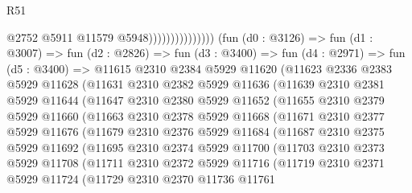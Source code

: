 \begin{lexlean}{R51}
\begin{coremodule}
                                      @2752
                                      @5911
                                      @11579
                                      @5948)))))))))))))))
        (fun (d0 : @3126) =>
        fun (d1 : @3007) =>
        fun (d2 : @2826) =>
        fun (d3 : @3400) =>
        fun (d4 : @2971) =>
        fun (d5 : @3400) =>
        @11615
          @2310
          @2384
          @5929
          @11620
          (@11623
            @2336
            @2383
            @5929
            @11628
            (@11631
              @2310
              @2382
              @5929
              @11636
              (@11639
                @2310
                @2381
                @5929
                @11644
                (@11647
                  @2310
                  @2380
                  @5929
                  @11652
                  (@11655
                    @2310
                    @2379
                    @5929
                    @11660
                    (@11663
                      @2310
                      @2378
                      @5929
                      @11668
                      (@11671
                        @2310
                        @2377
                        @5929
                        @11676
                        (@11679
                          @2310
                          @2376
                          @5929
                          @11684
                          (@11687
                            @2310
                            @2375
                            @5929
                            @11692
                            (@11695
                              @2310
                              @2374
                              @5929
                              @11700
                              (@11703
                                @2310
                                @2373
                                @5929
                                @11708
                                (@11711
                                  @2310
                                  @2372
                                  @5929
                                  @11716
                                  (@11719
                                    @2310
                                    @2371
                                    @5929
                                    @11724
                                    (@11729
                                      @2310
                                      @2370
                                      @11736
                                      @11761

\end{coremodule}
\end{lexlean}
